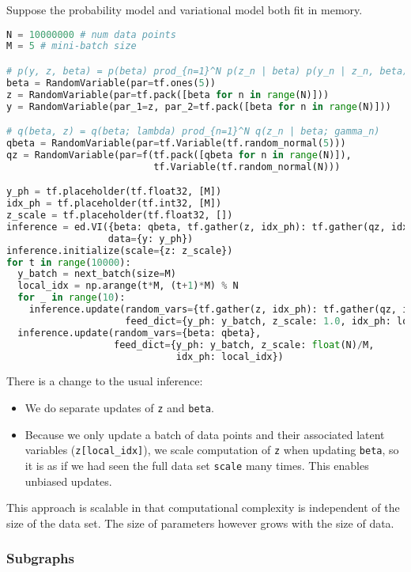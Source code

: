 Suppose the probability model and variational model both fit in
memory.
\begin{lstlisting}[language=Python]
N = 10000000 # num data points
M = 5 # mini-batch size

# p(y, z, beta) = p(beta) prod_{n=1}^N p(z_n | beta) p(y_n | z_n, beta)
beta = RandomVariable(par=tf.ones(5))
z = RandomVariable(par=tf.pack([beta for n in range(N)]))
y = RandomVariable(par_1=z, par_2=tf.pack([beta for n in range(N)]))

# q(beta, z) = q(beta; lambda) prod_{n=1}^N q(z_n | beta; gamma_n)
qbeta = RandomVariable(par=tf.Variable(tf.random_normal(5)))
qz = RandomVariable(par=f(tf.pack([qbeta for n in range(N)]),
                          tf.Variable(tf.random_normal(N)))

y_ph = tf.placeholder(tf.float32, [M])
idx_ph = tf.placeholder(tf.int32, [M])
z_scale = tf.placeholder(tf.float32, [])
inference = ed.VI({beta: qbeta, tf.gather(z, idx_ph): tf.gather(qz, idx_ph)},
                  data={y: y_ph})
inference.initialize(scale={z: z_scale})
for t in range(10000):
  y_batch = next_batch(size=M)
  local_idx = np.arange(t*M, (t+1)*M) % N
  for _ in range(10):
    inference.update(random_vars={tf.gather(z, idx_ph): tf.gather(qz, idx_ph)},
                     feed_dict={y_ph: y_batch, z_scale: 1.0, idx_ph: local_idx})
  inference.update(random_vars={beta: qbeta},
                   feed_dict={y_ph: y_batch, z_scale: float(N)/M,
                              idx_ph: local_idx})
\end{lstlisting}
There is a change to the usual inference:
\begin{itemize}
\item
  We do separate updates of \texttt{z} and \texttt{beta}.
\item Because we only update a
  batch of data points and their associated latent variables
  (\texttt{z[local_idx]}), we scale computation of \texttt{z} when updating
  \texttt{beta}, so it is as if we had seen the full data set \texttt{scale} many
  times. This enables unbiased updates.
\end{itemize}

This approach is scalable in that computational complexity is
independent of the size of the data set. The size of parameters
however grows with the size of data.

\subsubsection{Subgraphs}

